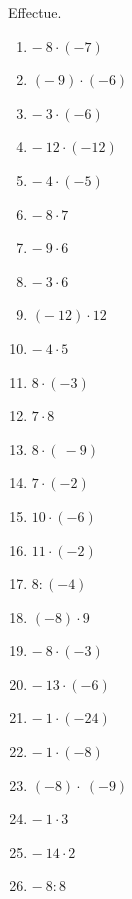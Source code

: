 \documentclass[../../syllabus_1.tex]{subfiles}
\begin{document}
\begin{exercise}
    Effectue.
    \begin{enumerate}[itemsep=.3cm, cols=3]
        \item \(- \ 8 \cdot ( - 7) \)
        \item \((- \ 9) \cdot ( - 6) \)
        \item \(- \ 3 \cdot ( - 6) \)
        \item \(- \ 12 \cdot ( - 12) \)
        \item \(- \ 4 \cdot ( - 5) \)
        \item \(- \ 8 \cdot 7 \)
        \item \(- \ 9 \cdot 6 \)
        \item \(- \ 3 \cdot 6 \)
        \item \((- \ 12) \cdot 12 \)
        \item \(- \ 4 \cdot 5 \)
        \item \(8\cdot (-3)\)
        \item \(7\cdot 8\)
        \item \(8 \cdot (\  - 9) \)
        \item \(7 \cdot ( - 2) \)
        \item \(10 \cdot ( - 6) \)
        \item \(11 \cdot ( - 2) \)
        \item \(8 : ( - 4) \)
        \item \(( - 8) \cdot 9 \)
        \item \(- \ 8 \cdot ( - 3) \)
        \item \(- \ 13 \cdot ( - 6) \)
        \item \(- \ 1 \cdot ( - 24) \)
        \item \(- \ 1 \cdot ( - 8) \)
        \item \(( - 8) \cdot \ ( - 9) \)
        \item \(- \ 1 \cdot 3 \)
        \item \(- \ 14 \cdot 2 \)
        \item \(- \ 8 : 8 \)
    \end{enumerate}
\end{exercise}
\end{document}
